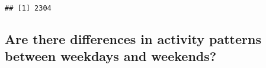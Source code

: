 \documentclass[
]{article}
\begin{document}
\begin{verbatim}
## [1] 2304
\end{verbatim}

\hypertarget{are-there-differences-in-activity-patterns-between-weekdays-and-weekends}{%
\subsection{Are there differences in activity patterns between weekdays
and
weekends?}\label{are-there-differences-in-activity-patterns-between-weekdays-and-weekends}}
\end{document}
